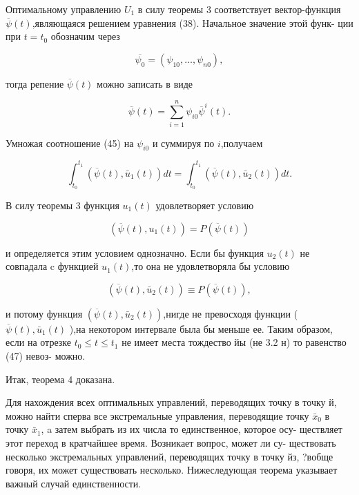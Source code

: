 \documentclass[10pt]{article}
\begin{document}
Оптимальному управлению \({U}_{1}\) в силу теоремы 3 соответствует вектор-функция \(\overline{\psi }\left( t\right)\),являющаяся решением уравнения (38). Начальное значение этой функ- ции при \(t = {t}_{0}\) обозначим через

\[
\overline{{\psi }_{0}} = \left( {{\psi }_{10},\ldots,{\psi }_{n0}}\right),
\]

тогда репение \(\overline{\psi }\left( t\right)\) можно записать в виде

\[
\overline{\psi }\left( t\right)  = \mathop{\sum }\limits_{{i = 1}}^{n}{\psi }_{i0}{\overline{\psi }}^{i}\left( t\right). \tag{46}
\]

Умножая соотношение (45) на \({\psi }_{i0}\) и суммируя по \(i\),получаем

\[
{\int }_{{t}_{0}}^{{t}_{1}}\left( {\overline{\psi }\left( t\right),{\bar{u}}_{1}\left( t\right) }\right) {dt} = {\int }_{{t}_{0}}^{{t}_{1}}\left( {\overline{\psi }\left( t\right),{\bar{u}}_{2}\left( t\right) }\right) {dt}. \tag{47}
\]

В силу теоремы 3 функция \({u}_{1}\left( t\right)\) удовлетворяет условию

\[
\left( {\overline{\psi }\left( t\right),{u}_{1}\left( t\right) }\right)  = P\left( {\overline{\psi }\left( t\right) }\right)
\]

и определяется этим условием однозначно. Если бы функция \({u}_{2}\left( t\right)\) не совпадала c функцией \({u}_{1}\left( t\right)\),то она не удовлетворяла бы условию

\[
\left( {\overline{\psi }\left( t\right),{\bar{u}}_{2}\left( t\right) }\right)  \equiv  P\left( {\overline{\psi }\left( t\right) }\right),
\]

и потому функция \(\left( {\overline{\psi }\left( t\right),{\bar{u}}_{2}\left( t\right) }\right)\),нигде не превосходя функции ( \(\overline{\psi }\left( t\right),{\bar{u}}_{1}\left( t\right)\) ),на некотором интервале была бы меньше ее. Таким образом, если на отрезке \({t}_{0} \leq  t \leq  {t}_{1}\) не имеет места тождество йы (не 3.2 н) то равенство (47) невоз- можно.

Итак, теорема 4 доказана.

Для нахождения всех оптимальных управлений, переводящих точку в точку й, можно найти сперва все экстремальные управления, переводящие точку \({\bar{x}}_{0}\) в точку \({\bar{x}}_{1}\), a затем выбрать из их числа то единственное, которое осу- ществляет этот переход в кратчайшее время. Возникает вопрос, может ли су- ществовать несколько экстремальных управлений, переводящих точку в точку йз, ?вобще говоря, их может существовать несколько. Нижеследующая теорема указывает важный случай единственности.
\end{document}
